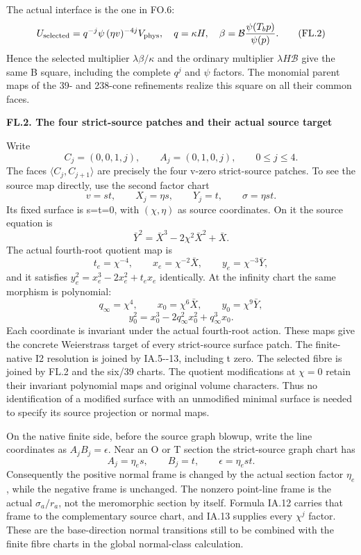 The actual interface is the one in FO.6:
\[
 U_{\rm selected}=q^{-j}\psi\,(\eta v)^{-4j}V_{\rm phys},
 \quad q=\kappa H,\quad
 \beta=\mathcal B\frac{\psi(T_bp)}{\psi(p)}.
\tag{FL.2}
\]
Hence the selected multiplier \(\lambda\beta/\kappa\)
and the ordinary multiplier \(\lambda H\mathcal B\)
give the same B square, including the complete \(q^j\)
and \(\psi\) factors. The monomial parent maps of the
39- and 238-cone refinements realize this square on all
their common faces.

\par

\medskip\noindent\textbf{FL.2. The four strict-source patches and their actual source target}

\par\nobreak

Write
\[
 C_j=(0,0,1,j),\qquad A_j=(0,1,0,j),\qquad0\le j\le4.
\]
The faces \(\langle C_j,C_{j+1}\rangle\) are precisely
the four v-zero strict-source patches. To see the source
map directly, use the second factor chart
\[
 v=st,\qquad X_j=\eta s,\qquad Y_j=t,
 \qquad\sigma=\eta st.
\tag{FL.3}
\]
Its fixed surface is s=t=0, with \((\chi,\eta)\)
as source coordinates. On it the source equation is
\[
 \bar Y^2=\bar X^3-2\chi^2\bar X^2+\bar X.
\]
The actual fourth-root quotient map is
\[
 t_e=\chi^{-4},\qquad x_e=\chi^{-2}\bar X,
 \qquad y_e=\chi^{-3}\bar Y,
\tag{FL.4}
\]
and it satisfies
\(y_e^2=x_e^3-2x_e^2+t_ex_e\) identically. At the
infinity chart the same morphism is polynomial:
\[
 q_\infty=\chi^4,\qquad x_0=\chi^6\bar X,
 \qquad y_0=\chi^9\bar Y,
\]
\[
 y_0^2=x_0^3-2q_\infty^2x_0^2+q_\infty^3x_0.
\tag{FL.5}
\]
Each coordinate is invariant under the actual fourth-root
action. These maps give the concrete Weierstrass target
of every strict-source surface patch. The finite-native
I2 resolution is joined by IA.5-\/-13, including t zero.
The selected fibre is joined by FL.2 and the six/39
charts. The quotient modifications at \(\chi=0\)
retain their invariant polynomial maps and original
volume characters. Thus no identification of a modified
surface with an unmodified minimal surface is needed to
specify its source projection or normal maps.

On the native finite side, before the source graph
blowup, write the line coordinates as
\(A_jB_j=\epsilon\). Near an O or T section the
strict-source graph chart has
\[
 A_j=\eta_e s,\qquad B_j=t,\qquad
 \epsilon=\eta_e st.
\tag{FL.6}
\]
Consequently the positive normal frame is changed by
the actual section factor \(\eta_e\), while the
negative frame is unchanged. The nonzero point-line
frame is the actual \(\sigma_a/r_a\), not the
meromorphic section by itself. Formula IA.12 carries
that frame to the complementary source chart, and
IA.13 supplies every \(\chi^j\) factor. These are
the base-direction normal transitions still to be
combined with the finite fibre charts in the global
normal-class calculation.

